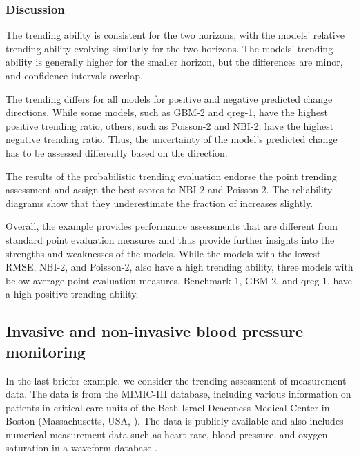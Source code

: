 \documentclass[pdflatex]{sn-jnl}
\theoremstyle{plain}%
\theoremstyle{definition}
\begin{document}
\subsubsection*{Discussion}

The trending ability is consistent for the two horizons, with the models' relative trending ability evolving similarly for the two horizons.
The models' trending ability is generally higher for the smaller horizon, but the differences are minor, and confidence intervals overlap.

The trending differs for all models for positive and negative predicted change directions.
While some models, such as GBM-2 and qreg-1, have the highest positive trending ratio, others, such as Poisson-2 and NBI-2, have the highest negative trending ratio.
Thus, the uncertainty of the model's predicted change has to be assessed differently based on the direction.

The results of the probabilistic trending evaluation endorse the point trending assessment and assign the best scores to NBI-2 and Poisson-2.
The reliability diagrams show that they underestimate the fraction of increases slightly.

Overall, the example provides performance assessments that are different from standard point evaluation measures and thus provide further insights into the strengths and weaknesses of the models.
While the models with the lowest RMSE, NBI-2, and Poisson-2, also have a high trending ability, three models with below-average point evaluation measures, Benchmark-1, GBM-2, and qreg-1, have a high positive trending ability.


\subsection{Invasive and non-invasive blood pressure monitoring} \label{sec:application_measurement}

In the last briefer example, we consider the trending assessment of measurement data.
The data is from the MIMIC-III database, including various information on patients in critical care units of the Beth Israel Deaconess Medical Center in Boston (Massachusetts, USA, \cite{Johnson2016}).
The data is publicly available and also includes numerical measurement data such as heart rate, blood pressure, and oxygen saturation in a waveform database \citetext{\citealp{Moody2017}; available through \citealp{Goldberger2000}}.
\end{document}
